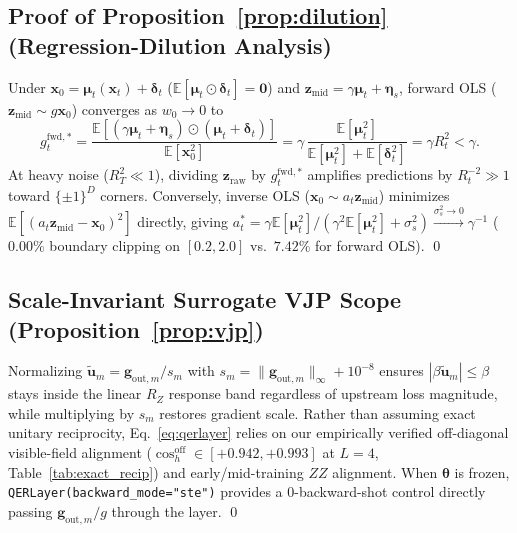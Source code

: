 \documentclass[11pt]{article}
\begin{document}
\subsection{Proof of Proposition~\ref{prop:dilution} (Regression-Dilution Analysis)}
Under $\mathbf{x}_0 = \boldsymbol{\mu}_t(\mathbf{x}_t)+\boldsymbol{\delta}_t$ ($\mathbb{E}[\boldsymbol{\mu}_t\odot\boldsymbol{\delta}_t]=\mathbf{0}$) and $\mathbf{z}_{\text{mid}}=\gamma\boldsymbol{\mu}_t+\boldsymbol{\eta}_s$, forward OLS ($\mathbf{z}_{\text{mid}}\sim g\mathbf{x}_0$) converges as $w_0{\to}0$ to
\begin{equation}
  g_t^{\text{fwd},*} = \frac{\mathbb{E}[(\gamma\boldsymbol{\mu}_t+\boldsymbol{\eta}_s)\odot(\boldsymbol{\mu}_t+\boldsymbol{\delta}_t)]}{\mathbb{E}[\mathbf{x}_0^2]} = \gamma\,\frac{\mathbb{E}[\boldsymbol{\mu}_t^2]}{\mathbb{E}[\boldsymbol{\mu}_t^2]+\mathbb{E}[\boldsymbol{\delta}_t^2]} = \gamma R_t^2 < \gamma.
\end{equation}
At heavy noise ($R_T^2\ll 1$), dividing $\mathbf{z}_{\text{raw}}$ by $g_t^{\text{fwd},*}$ amplifies predictions by $R_t^{-2}\gg 1$ toward $\{\pm 1\}^D$ corners. Conversely, inverse OLS ($\mathbf{x}_0 \sim a_t\mathbf{z}_{\text{mid}}$) minimizes $\mathbb{E}[(a_t\mathbf{z}_{\text{mid}}-\mathbf{x}_0)^2]$ directly, giving $a_t^* = \gamma\mathbb{E}[\boldsymbol{\mu}_t^2]/(\gamma^2\mathbb{E}[\boldsymbol{\mu}_t^2]+\sigma_s^2)\xrightarrow{\sigma_s^2\to 0}\gamma^{-1}$ ($0.00\%$ boundary clipping on $[0.2,2.0]$ vs.\ $7.42\%$ for forward OLS). \qed

\subsection{Scale-Invariant Surrogate VJP Scope (Proposition~\ref{prop:vjp})}
Normalizing $\tilde{\mathbf{u}}_m = \mathbf{g}_{\text{out},m}/s_m$ with $s_m = \|\mathbf{g}_{\text{out},m}\|_\infty + 10^{-8}$ ensures $|\beta\tilde{\mathbf{u}}_m| \le \beta$ stays inside the linear $R_Z$ response band regardless of upstream loss magnitude, while multiplying by $s_m$ restores gradient scale. Rather than assuming exact unitary reciprocity, Eq.~\eqref{eq:qerlayer} relies on our empirically verified off-diagonal visible-field alignment ($\cos_h^{\text{off}} \in [+0.942, +0.993]$ at $L{=}4$, Table~\ref{tab:exact_recip}) and early/mid-training $ZZ$ alignment. When $\boldsymbol{\theta}$ is frozen, \texttt{QERLayer(backward\_mode="ste")} provides a $0$-backward-shot control directly passing $\mathbf{g}_{\text{out},m}/g$ through the layer. \qed
\end{document}
